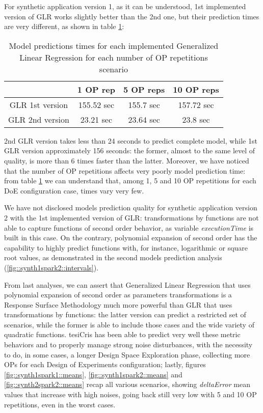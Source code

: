 For synthetic application version 1, as it can be understood, 1st implemented version of GLR works slightly better than the 2nd one, but their prediction times are very different, as shown in table \ref{tab::GLRtimes}:

\begin{table}[H]

    \centering
    
    \begin{tabular}{cccc}
    
        \toprule
         & 1 OP rep & 5 OP reps & 10 OP reps \\
        \midrule
        GLR 1st version & 155.52 sec & 155.7 sec & 157.72 sec \\
        GLR 2nd version & 23.21 sec & 23.64 sec & 23.8 sec \\
        \bottomrule 
    
    \end{tabular}

    \caption{Model predictions times for each implemented Generalized Linear Regression for each number of OP repetitions scenario}
    \label{tab::GLRtimes}
    
\end{table}

2nd GLR version takes less than 24 seconds to predict complete model, while 1st GLR version approximately 156 seconds: the former, almost to the same level of quality, is more than 6 times faster than the latter. Moreover, we have noticed that the number of OP repetitions affects very poorly model prediction time: from table \ref{tab::GLRtimes} we can understand that, among 1, 5 and 10 OP repetitions for each DoE configuration case, times vary very few.

We have not disclosed models prediction quality for synthetic application version 2 with the 1st implemented version of GLR: transformations by functions are not able to capture functions of second order behavior, as variable \textit{executionTime} is built in this case. On the contrary, polynomial expansion of second order has the capability to highly predict functions with, for instance, logarithmic or square root values, as demonstrated in the second models prediction analysis (\ref{fig::synth1spark2::intervals}).

From last analyses, we can assert that Generalized Linear Regression that uses polynomial expansion of second order as parameters transformations is a Response Surface Methodology much more powerful than GLR that uses transformations by functions: the latter version can predict a restricted set of scenarios, while the former is able to include those cases and the wide variety of quadratic functions. tesiCris has been able to predict very well these metric behaviors and to properly manage strong noise disturbances, with the necessity to do, in some cases, a longer Design Space Exploration phase, collecting more OPs for each Design of Experiments configuration; lastly, figures \ref{fig::synth1spark1::means}, \ref{fig::synth1spark2::means} and \ref{fig::synth2spark2::means} recap all various scenarios, showing \textit{deltaError} mean values that increase with high noises, going back still very low with 5 and 10 OP repetitions, even in the worst cases.


